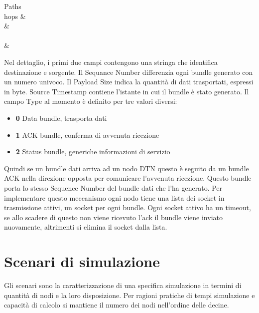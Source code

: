 \documentclass[12pt,a4paper,oneside]{book}
\begin{document}
\begin{itemize}
\begin{bytefield}[bitwidth=0.5em]{64}
				\begin{rightwordgroup}{Paths \\ hops}
					 &  \\
					 &  \\
					 \\[1ex]
					 & 
				\end{rightwordgroup}
				
			\end{bytefield}
			\vspace{25pt}
			
			Nel dettaglio, i primi due campi contengono una stringa che identifica destinazione e sorgente. Il Sequance Number differenzia ogni bundle generato con un numero univoco. Il Payload Size indica la quantità di dati trasportati, espressi in byte. Source Timestamp contiene l'istante in cui il bundle è stato generato. Il campo Type al momento è definito per tre valori diversi: 
			\begin{itemize}
				\item {\bf 0} Data bundle, trasporta dati
				\item {\bf 1} ACK bundle, conferma di avvenuta ricezione
				\item {\bf 2} Status bundle, generiche informazioni di servizio
			\end{itemize}
			
			Quindi se un bundle dati arriva ad un nodo DTN questo è seguito da un bundle ACK nella direzione opposta per comunicare l'avvenuta ricezione. Questo bundle porta lo stesso Sequence Number del bundle dati che l'ha generato. Per implementare questo meccanismo ogni nodo tiene una lista dei socket in trasmissione attivi, un socket per ogni bundle. Ogni socket attivo ha un timeout, se allo scadere di questo non viene ricevuto l'ack il bundle viene inviato nuovamente, altrimenti si elimina il socket dalla lista. 
				
		\end{itemize}
			
		\section{Scenari di simulazione} \label{scenSim}
		Gli scenari sono la caratterizzazione di una specifica simulazione in termini di quantità di nodi e la loro disposizione. Per ragioni pratiche di tempi simulazione e capacità di calcolo si mantiene il numero dei nodi nell'ordine delle decine.
		
\end{document}
